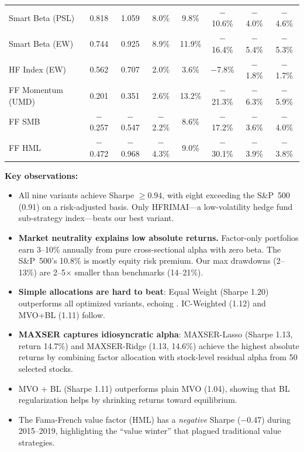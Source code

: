 \documentclass[12pt,a4paper]{article}
\begin{document}
\begin{table}[H]
{\begin{tabular}{lccccccc}
Smart Beta (PSL)   & 0.818 & 1.059 & 8.0\%  & 9.8\%  & $-$10.6\% & $-$4.0\% & $-$4.6\% \\
Smart Beta (EW)    & 0.744 & 0.925 & 8.9\%  & 11.9\% & $-$16.4\% & $-$5.4\% & $-$5.3\% \\
HF Index (EW)      & 0.562 & 0.707 & 2.0\%  & 3.6\%  & $-$7.8\%  & $-$1.8\% & $-$1.7\% \\
FF Momentum (UMD)  & 0.201 & 0.351 & 2.6\%  & 13.2\% & $-$21.3\% & $-$6.3\% & $-$5.9\% \\
FF SMB             & $-$0.257 & $-$0.547 & $-$2.2\% & 8.6\% & $-$17.2\% & $-$3.6\% & $-$4.0\% \\
FF HML             & $-$0.472 & $-$0.968 & $-$4.3\% & 9.0\% & $-$30.1\% & $-$3.9\% & $-$3.8\% \\
\bottomrule
\end{tabular}}
\end{table}

\textbf{Key observations:}
\begin{itemize}[noitemsep]
    \item All nine variants achieve Sharpe $\geq 0.94$, with eight exceeding the S\&P~500 (0.91) on a risk-adjusted basis. Only HFRIMAI---a low-volatility hedge fund sub-strategy index---beats our best variant.
    \item \textbf{Market neutrality explains low absolute returns.} Factor-only portfolios earn 3--10\% annually from pure cross-sectional alpha with zero beta. The S\&P~500's 10.8\% is mostly equity risk premium. Our max drawdowns (2--13\%) are 2--5$\times$ smaller than benchmarks (14--21\%).
    \item \textbf{Simple allocations are hard to beat}: Equal Weight (Sharpe 1.20) outperforms all optimized variants, echoing \citet{demiguel2009optimal}. IC-Weighted (1.12) and MVO+BL (1.11) follow.
    \item \textbf{MAXSER captures idiosyncratic alpha}: MAXSER-Lasso (Sharpe 1.13, return 14.7\%) and MAXSER-Ridge (1.13, 14.6\%) achieve the highest absolute returns by combining factor allocation with stock-level residual alpha from 50 selected stocks.
    \item MVO + BL (Sharpe 1.11) outperforms plain MVO (1.04), showing that BL regularization helps by shrinking returns toward equilibrium.
    \item The Fama-French value factor (HML) has a \textit{negative} Sharpe ($-$0.47) during 2015--2019, highlighting the ``value winter'' that plagued traditional value strategies.
\end{itemize}
\end{document}
